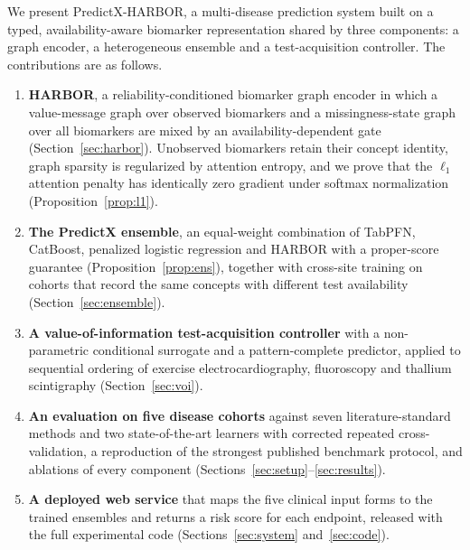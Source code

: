 We present PredictX-HARBOR, a multi-disease prediction system built on a typed, availability-aware biomarker representation shared by three components: a graph encoder, a heterogeneous ensemble and a test-acquisition controller. The contributions are as follows.
\begin{enumerate}\itemsep1pt
\item \textbf{HARBOR}, a reliability-conditioned biomarker graph encoder in which a value-message graph over observed biomarkers and a missingness-state graph over all biomarkers are mixed by an availability-dependent gate (Section~\ref{sec:harbor}). Unobserved biomarkers retain their concept identity, graph sparsity is regularized by attention entropy, and we prove that the $\ell_1$ attention penalty has identically zero gradient under softmax normalization (Proposition~\ref{prop:l1}).
\item \textbf{The PredictX ensemble}, an equal-weight combination of TabPFN, CatBoost, penalized logistic regression and HARBOR with a proper-score guarantee (Proposition~\ref{prop:ens}), together with cross-site training on cohorts that record the same concepts with different test availability (Section~\ref{sec:ensemble}).
\item \textbf{A value-of-information test-acquisition controller} with a non-parametric conditional surrogate and a pattern-complete predictor, applied to sequential ordering of exercise electrocardiography, fluoroscopy and thallium scintigraphy (Section~\ref{sec:voi}).
\item \textbf{An evaluation on five disease cohorts} against seven literature-standard methods and two state-of-the-art learners with corrected repeated cross-validation, a reproduction of the strongest published benchmark protocol, and ablations of every component (Sections~\ref{sec:setup}--\ref{sec:results}).
\item \textbf{A deployed web service} that maps the five clinical input forms to the trained ensembles and returns a risk score for each endpoint, released with the full experimental code (Sections~\ref{sec:system} and~\ref{sec:code}).
\end{enumerate}
